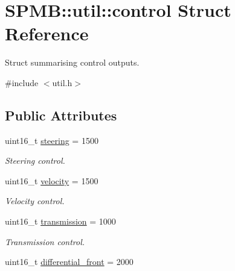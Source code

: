 \hypertarget{structSPMB_1_1util_1_1control}{}\section{S\+P\+MB\+:\+:util\+:\+:control Struct Reference}
\label{structSPMB_1_1util_1_1control}


Struct summarising control outputs.  




{\ttfamily \#include $<$util.\+h$>$}

\subsection*{Public Attributes}
\begin{DoxyCompactItemize}
\item 
uint16\+\_\+t \hyperlink{structSPMB_1_1util_1_1control_a3c5769abea97ec110e185959341d380b}{steering} = 1500\hypertarget{structSPMB_1_1util_1_1control_a3c5769abea97ec110e185959341d380b}{}\label{structSPMB_1_1util_1_1control_a3c5769abea97ec110e185959341d380b}

\begin{DoxyCompactList}\small\item\em Steering control. \end{DoxyCompactList}\item 
uint16\+\_\+t \hyperlink{structSPMB_1_1util_1_1control_af70feca597f3e9b5f3455c505168de22}{velocity} = 1500\hypertarget{structSPMB_1_1util_1_1control_af70feca597f3e9b5f3455c505168de22}{}\label{structSPMB_1_1util_1_1control_af70feca597f3e9b5f3455c505168de22}

\begin{DoxyCompactList}\small\item\em Velocity control. \end{DoxyCompactList}\item 
uint16\+\_\+t \hyperlink{structSPMB_1_1util_1_1control_a2ba2a5faedcc2325ad316c6d51531317}{transmission} = 1000\hypertarget{structSPMB_1_1util_1_1control_a2ba2a5faedcc2325ad316c6d51531317}{}\label{structSPMB_1_1util_1_1control_a2ba2a5faedcc2325ad316c6d51531317}

\begin{DoxyCompactList}\small\item\em Transmission control. \end{DoxyCompactList}\item 
uint16\+\_\+t \hyperlink{structSPMB_1_1util_1_1control_a34fef2f127cc0704f391af42ed05c0e8}{differential\+\_\+front} = 2000\hypertarget{structSPMB_1_1util_1_1control_a34fef2f127cc0704f391af42ed05c0e8}{}\label{structSPMB_1_1util_1_1control_a34fef2f127cc0704f391af42ed05c0e8}


\end{DoxyCompactItemize}
